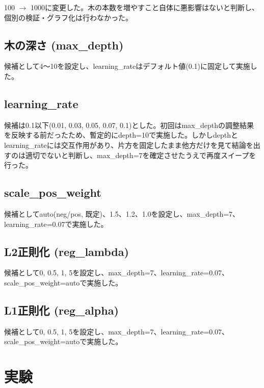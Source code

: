 \documentclass[dvipdfmx, a4paper, 11pt, titlepage]{jsarticle}
\begin{document}
100 $\to$ 1000に変更した。木の本数を増やすこと自体に悪影響はないと判断し、個別の検証・グラフ化は行わなかった。
 
\subsection{木の深さ (max\_depth)}
 
候補として4〜10を設定し、learning\_rateはデフォルト値(0.1)に固定して実施した。
 
\subsection{learning\_rate}
 
候補は0.1以下(0.01, 0.03, 0.05, 0.07, 0.1)とした。初回はmax\_depthの調整結果を反映する前だったため、暫定的にdepth=10で実施した。しかしdepthとlearning\_rateには交互作用があり、片方を固定したまま他方だけを見て結論を出すのは適切でないと判断し、max\_depth=7を確定させたうえで再度スイープを行った。
 
\subsection{scale\_pos\_weight}
 
候補としてauto(neg/pos, 既定)、1.5、1.2、1.0を設定し、max\_depth=7、learning\_rate=0.07で実施した。
 
\subsection{L2正則化 (reg\_lambda)}
 
候補として0, 0.5, 1, 5を設定し、max\_depth=7、learning\_rate=0.07、scale\_pos\_weight=autoで実施した。
 
\subsection{L1正則化 (reg\_alpha)}
 
候補として0, 0.5, 1, 5を設定し、max\_depth=7、learning\_rate=0.07、scale\_pos\_weight=autoで実施した。


\section{実験}
\end{document}
